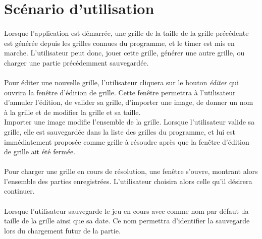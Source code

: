 \section{Scénario d'utilisation}
        \paragraph*{}
        Lorsque l'application est démarrée, une grille de la taille de la grille précédente est générée depuis les grilles connues du programme, et le timer est mis en marche. L'utilisateur peut donc, jouer cette grille, générer une autre grille, ou charger une partie précédemment sauvegardée.
        \paragraph*{}
        Pour éditer une nouvelle grille, l'utilisateur cliquera sur le bouton \textit{éditer} qui ouvrira la fenêtre d'édition de grille.
        Cette fenêtre permettra à l'utilisateur d'annuler l'édition, de valider sa grille, d'importer une image, de donner un nom à la grille et de modifier la grille et sa taille.\\
        Importer une image modifie l'ensemble de la grille.
        Lorsque l'utilisateur valide sa grille, elle est sauvegardée dans la liste des grilles du programme, et lui est immédiatement proposée comme grille à résoudre après que la fenêtre d'édition de grille ait été fermée.\\
        \paragraph*{}
        Pour charger une grille en cours de résolution, une fenêtre s'ouvre, montrant alors l'ensemble des parties enregistrées. L'utilisateur choisira alors celle qu'il désirera continuer.
        \paragraph*{}
        Lorsque l'utilisateur sauvegarde le jeu en cours avec comme nom par défaut :la taille de la grille ainsi que sa date. Ce nom permettra d'identifier la sauvegarde lors du chargement futur de la partie.




